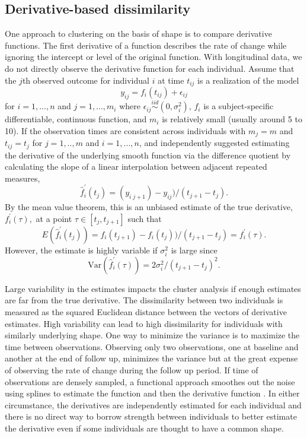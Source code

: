 \subsection{Derivative-based dissimilarity}
One approach to clustering on the basis of shape is to compare derivative functions. The first derivative of a function describes the rate of change while ignoring the intercept or level of the original function. With longitudinal data, we do not directly observe the derivative function for each individual. Assume that the $j$th observed outcome for individual $i$ at time $t_{ij}$ is a realization of the model
$$y_{ij}= f_i(t_{ij})+\epsilon_{ij}$$
for $i=1,...,n$ and $j=1,...,m_{i}$ where $\epsilon_{ij}\overset{iid}{\sim} (0,\sigma_{i}^{2})$, $f_{i}$ is a subject-specific differentiable, continuous function, and $m_{i}$ is relatively small (usually around 5 to 10). If the observation times are consistent across individuals with $m_{j}=m$ and $t_{ij} = t_{j}$ for $j=1,..,m$ and $i=1,...,n$, \Textcite{moller2003} and \textcite{d2000} independently suggested estimating the derivative of the underlying smooth function via the difference quotient by calculating the slope of a linear interpolation between adjacent repeated measures,
$$\hat{f}_{i}^{'}(t_{j}) = (y_{i\;j+1})-y_{ij})/(t_{j+1}-t_j).$$
By the mean value theorem, this is an unbiased estimate of the true derivative, $f_{i}^{'}(\tau),$ at a point $\tau\in[t_{j},t_{j+1}]$ such that
$$E(\hat{f}_{i}^{'}(t_{j})) = f_i(t_{j+1})-f_i(t_j))/(t_{j+1}-t_j) =f_{i}^{'}(\tau). $$
However, the estimate is highly variable if $\sigma_{i}^{2}$ is large since
$$\text{Var}(\hat{f}_{i}^{'}(\tau)) =  2\sigma^{2}_{i}/ (t_{j+1}-t_j)^{2}.$$

Large variability in the estimates impacts the cluster analysis if enough estimates are far from the true derivative. The dissimilarity between two individuals is measured as the squared Euclidean distance between the vectors of derivative estimates. High variability can lead to high dissimilarity for individuals with similarly underlying shape. One way to minimize the variance is to maximize the time between observations. Observing only two observations, one at baseline and another at the end of follow up, minimizes the variance but at the great expense of observing the rate of change during the follow up period. If time of observations are densely sampled, a functional approach smoothes out the noise using splines to estimate the function and then the derivative function \cite{tarpey2003}. In either circumstance, the derivatives are independently estimated for each individual and there is no direct way to borrow strength between individuals to better estimate the derivative even if some individuals are thought to have a common shape.

